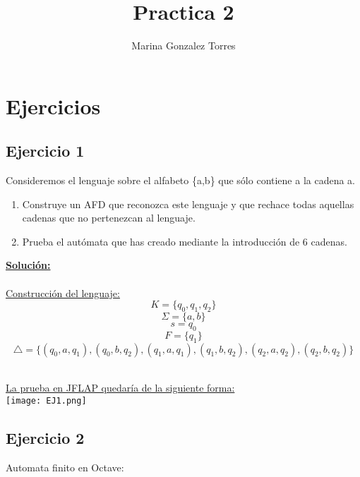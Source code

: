 \documentclass{article}
\title{Practica 2}
\author{Marina Gonzalez Torres}
\date{}
\begin{document}
\maketitle
\setlength{\parindent}{0pt}

\section*{Ejercicios}

\subsection*{Ejercicio 1}
Consideremos el lenguaje sobre el alfabeto \{a,b\} que sólo contiene a la cadena a.

\begin{enumerate}[label=\alph{enumi})]
    \item Construye un AFD que reconozca este lenguaje y que rechace todas aquellas cadenas que no pertenezcan al lenguaje.
    \item Prueba el autómata que has creado mediante la introducción de 6 cadenas.
\end{enumerate}

\underline{\textbf{Solución:}}
\\
\\ \underline{Construcción del lenguaje:}
\begin{equation*}
    K = \{q_0, q_1, q_2\}
\end{equation*}
\begin{equation*}
    \Sigma = \{a, b\}
\end{equation*}
\begin{equation*}
    s = q_0
\end{equation*}
\begin{equation*}
    F = \{q_1\}
\end{equation*}
\begin{equation*}
    \bigtriangleup = \{(q_0,a,q_1), (q_0,b,q_2), (q_1,a,q_1), (q_1,b,q_2), (q_2,a,q_2), (q_2,b,q_2)\}
\end{equation*}

\\ \underline{La prueba en JFLAP quedaría de la siguiente forma:}
\\ \texttt{[image: EJ1.png]}

\subsection*{Ejercicio 2}
Automata finito en Octave:
\end{document}

